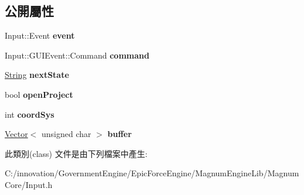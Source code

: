 \subsection*{公開屬性}
\begin{DoxyCompactItemize}
\item 
Input\+::\+Event {\bfseries event}\hypertarget{class_i_dream_sky_1_1_input_1_1_g_u_i_event_aa7a455b3a90d03d5f2b76aecc195fb7c}{}\label{class_i_dream_sky_1_1_input_1_1_g_u_i_event_aa7a455b3a90d03d5f2b76aecc195fb7c}

\item 
Input\+::\+G\+U\+I\+Event\+::\+Command {\bfseries command}\hypertarget{class_i_dream_sky_1_1_input_1_1_g_u_i_event_a7ecf247f7c799037db9b76e7f5c84340}{}\label{class_i_dream_sky_1_1_input_1_1_g_u_i_event_a7ecf247f7c799037db9b76e7f5c84340}

\item 
\hyperlink{class_i_dream_sky_1_1_string}{String} {\bfseries next\+State}\hypertarget{class_i_dream_sky_1_1_input_1_1_g_u_i_event_a5e96de3ae42c32fcc384ae7037f7342f}{}\label{class_i_dream_sky_1_1_input_1_1_g_u_i_event_a5e96de3ae42c32fcc384ae7037f7342f}

\item 
bool {\bfseries open\+Project}\hypertarget{class_i_dream_sky_1_1_input_1_1_g_u_i_event_ae61237724af300681f38d63a22c9e762}{}\label{class_i_dream_sky_1_1_input_1_1_g_u_i_event_ae61237724af300681f38d63a22c9e762}

\item 
int {\bfseries coord\+Sys}\hypertarget{class_i_dream_sky_1_1_input_1_1_g_u_i_event_aacb6e4fe80df6deec4423193dfb3ed2a}{}\label{class_i_dream_sky_1_1_input_1_1_g_u_i_event_aacb6e4fe80df6deec4423193dfb3ed2a}

\item 
\hyperlink{class_i_dream_sky_1_1_vector}{Vector}$<$ unsigned char $>$ {\bfseries buffer}\hypertarget{class_i_dream_sky_1_1_input_1_1_g_u_i_event_af8e60b6fbcdd23e7fa02ada09b06ac53}{}\label{class_i_dream_sky_1_1_input_1_1_g_u_i_event_af8e60b6fbcdd23e7fa02ada09b06ac53}

\end{DoxyCompactItemize}


此類別(class) 文件是由下列檔案中產生\+:\begin{DoxyCompactItemize}
\item 
C\+:/innovation/\+Government\+Engine/\+Epic\+Force\+Engine/\+Magnum\+Engine\+Lib/\+Magnum\+Core/Input.\+h\end{DoxyCompactItemize}
